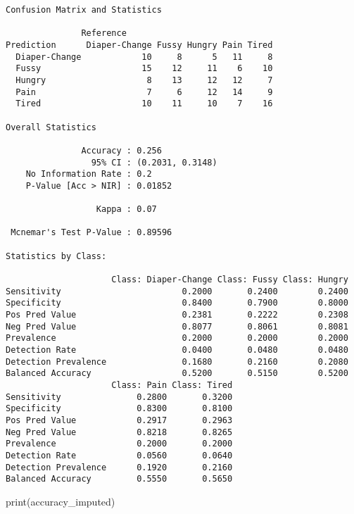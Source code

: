 \documentclass[
  letterpaper,
  DIV=11,
  numbers=noendperiod]{scrartcl}
\newenvironment{Shaded}{\begin{snugshade}}{\end{snugshade}}
\newcommand{\FunctionTok}[1]{\textcolor[rgb]{0.28,0.35,0.67}{#1}}
\newcommand{\NormalTok}[1]{\textcolor[rgb]{0.00,0.23,0.31}{#1}}
\begin{document}
\begin{verbatim}
Confusion Matrix and Statistics

               Reference
Prediction      Diaper-Change Fussy Hungry Pain Tired
  Diaper-Change            10     8      5   11     8
  Fussy                    15    12     11    6    10
  Hungry                    8    13     12   12     7
  Pain                      7     6     12   14     9
  Tired                    10    11     10    7    16

Overall Statistics
                                          
               Accuracy : 0.256           
                 95% CI : (0.2031, 0.3148)
    No Information Rate : 0.2             
    P-Value [Acc > NIR] : 0.01852         
                                          
                  Kappa : 0.07            
                                          
 Mcnemar's Test P-Value : 0.89596         

Statistics by Class:

                     Class: Diaper-Change Class: Fussy Class: Hungry
Sensitivity                        0.2000       0.2400        0.2400
Specificity                        0.8400       0.7900        0.8000
Pos Pred Value                     0.2381       0.2222        0.2308
Neg Pred Value                     0.8077       0.8061        0.8081
Prevalence                         0.2000       0.2000        0.2000
Detection Rate                     0.0400       0.0480        0.0480
Detection Prevalence               0.1680       0.2160        0.2080
Balanced Accuracy                  0.5200       0.5150        0.5200
                     Class: Pain Class: Tired
Sensitivity               0.2800       0.3200
Specificity               0.8300       0.8100
Pos Pred Value            0.2917       0.2963
Neg Pred Value            0.8218       0.8265
Prevalence                0.2000       0.2000
Detection Rate            0.0560       0.0640
Detection Prevalence      0.1920       0.2160
Balanced Accuracy         0.5550       0.5650
\end{verbatim}

\begin{Shaded}
\begin{Highlighting}[]
\FunctionTok{print}\NormalTok{(accuracy\_imputed)}
\end{Highlighting}
\end{Shaded}
\end{document}
